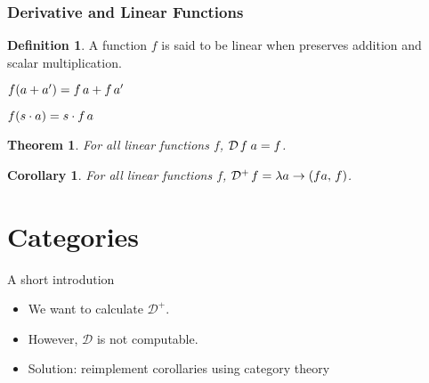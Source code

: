 \documentclass{beamer}
\newtheorem{teor}{Theorem}[section]
\newtheorem{coro}{Corollary}[section]
\theoremstyle{definition}
\newtheorem{defi}{Definition}[section]
\theoremstyle{definition}
\theoremstyle{theorem}
\begin{document}
\begin{frame}
\frametitle{Derivative and Linear Functions} 
\vspace{5mm}
\begin{defi}
	A function $f$ is said to be linear when preserves addition and scalar multiplication.
	\vspace{2mm}
	
	\hspace{5mm} $f(a + a')= f \hspace{0.5mm} a + f \hspace{0.5mm} a'$
	
	\vspace{1mm}
	\hspace{5mm} $f(s \cdot a)= s \cdot f \hspace{0.5mm} a$

\end{defi}
\pause
\vspace{4mm}
\begin{teor}
	For all linear functions $f$, $\mathcal{D} \hspace{0.5mm} f \hspace{0.9mm} a = f $.
\end{teor}
\pause
\vspace{2mm}
\begin{coro}
	For all linear functions  $f$, $\mathcal{D}^{+} \hspace{0.5mm} f = \lambda a \to (fa,\hspace{0.5mm} f)$.

\end{coro}
\end{frame}

\section{Categories}

\begin{frame}{A short introdution}
\begin{itemize}
 \item<1-> We want to calculate \ensuremath{\mathcal{D}^{+}}.
 \item<2-> However, \ensuremath{\mathcal{D}} is not computable.
 \item<3-> Solution: reimplement corollaries using category theory
\end{itemize}

\end{frame}
\end{document}
